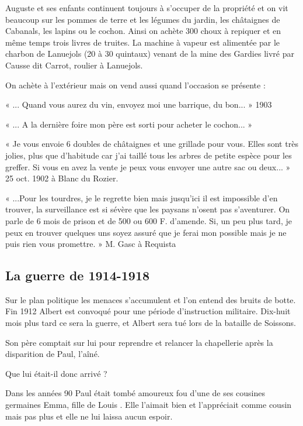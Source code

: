 Auguste et ses enfants continuent toujours à s’occuper de la propriété et on vit beaucoup sur
les pommes de terre et les légumes du jardin, les châtaignes de Cabanals, les lapins ou le
cochon. Ainsi on achète 300 choux à repiquer et en même temps trois livres de truites.
La machine à vapeur est alimentée par le charbon de Lanuejols (20 à 30 quintaux) venant de
la mine des Gardies livré par Causse dit Carrot, roulier à Lanuejols.

On achète à l’extérieur mais on vend aussi quand l’occasion se présente :

« ... Quand vous aurez du vin, envoyez moi une barrique, du bon... » 1903

« ... A la dernière foire mon père est sorti pour acheter le cochon... »

« Je vous envoie 6 doubles de châtaignes et une grillade pour vous. Elles sont très jolies,
plus que d’habitude car j’ai taillé tous les arbres de petite espèce pour les greffer. Si vous en
avez la vente je peux vous envoyer une autre sac ou deux... » 25 oct. 1902 à Blanc du Rozier.


« ...Pour les tourdres, je le regrette bien mais jusqu’ici il est impossible d’en trouver, la
surveillance est si sévère que les paysans n’osent pas s’aventurer. On parle de 6 mois de
prison et de 500 ou 600 F. d’amende. Si, un peu plus tard, je peux en trouver quelques uns soyez
assuré que je ferai mon possible mais je ne puis rien vous promettre. » M. Gasc à Requista

\medskip

\subsection{La guerre de 1914-1918}

Sur le plan politique les menaces s’accumulent et l’on entend des bruits de botte. Fin 1912
Albert est convoqué pour une période d’instruction militaire. Dix-huit mois plus tard ce sera la
guerre, et Albert sera tué lors de la bataille de Soissons.

Son père comptait sur lui pour reprendre et relancer la chapellerie après la disparition de Paul,
l’aîné.

\medskip

Que lui était-il donc arrivé ?

Dans les années 90 Paul était tombé amoureux fou d’une de ses cousines germaines Emma,
fille de Louis . Elle l’aimait bien et l’appréciait comme cousin mais pas plus et elle ne lui
laissa aucun espoir.

